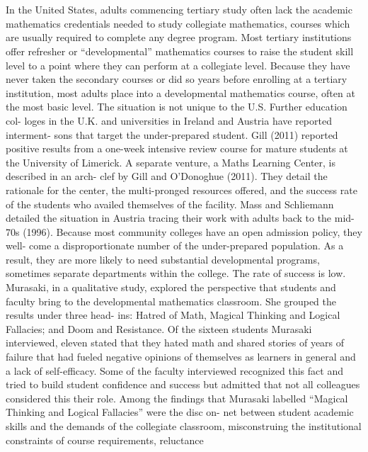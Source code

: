 \documentclass{article}
\begin{document}
\textit{\\\\}
 In the United States, adults commencing tertiary study often lack the academic
 mathematics credentials needed to study collegiate mathematics, courses which
 are usually required to complete any degree program. Most tertiary institutions
 offer refresher or “developmental” mathematics courses to raise the student skill
 level to a point where they can perform at a collegiate level. Because they have
 never taken the secondary courses or did so years before enrolling at a tertiary
 institution, most adults place into a developmental mathematics course, often at
 the most basic level. The situation is not unique to the U.S. Further education col-
   loges in the U.K. and universities in Ireland and Austria have reported interment-
   sons that target the under-prepared student. Gill (2011) reported positive results
 from a one-week intensive review course for mature students at the University of
 Limerick. A separate venture, a Maths Learning Center, is described in an arch-
   clef by Gill and O’Donoghue (2011). They detail the rationale for the center, the
 multi-pronged resources offered, and the success rate of the students who availed
 themselves of the facility. Mass and Schliemann detailed the situation in Austria
 tracing their work with adults back to the mid-70s (1996).
 Because most community colleges have an open admission policy, they well-
   come a disproportionate number of the under-prepared population. As a result,
 they are more likely to need substantial developmental programs, sometimes
 separate departments within the college. The rate of success is low. Murasaki, in a
 qualitative study, explored the perspective that students and faculty bring to the
 developmental mathematics classroom. She grouped the results under three head-
   ins: Hatred of Math, Magical Thinking and Logical Fallacies; and Doom and
 Resistance. Of the sixteen students Murasaki interviewed, eleven stated that they
 hated math and shared stories of years of failure that had fueled negative opinions
 of themselves as learners in general and a lack of self-efficacy. Some of the faculty
 interviewed recognized this fact and tried to build student confidence and success
 but admitted that not all colleagues considered this their role. Among the findings
 that Murasaki labelled “Magical Thinking and Logical Fallacies” were the disc on-
   net between student academic skills and the demands of the collegiate classroom,
 misconstruing the institutional constraints of course requirements, reluctance
\end{document}

